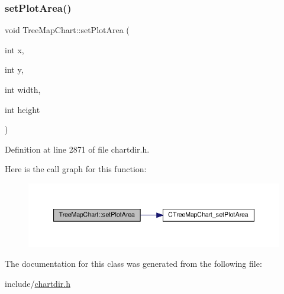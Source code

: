 \subsubsection{\texorpdfstring{set\+Plot\+Area()}{setPlotArea()}}
{\footnotesize\ttfamily void Tree\+Map\+Chart\+::set\+Plot\+Area (\begin{DoxyParamCaption}\item[{int}]{x,  }\item[{int}]{y,  }\item[{int}]{width,  }\item[{int}]{height }\end{DoxyParamCaption})\hspace{0.3cm}{\ttfamily [inline]}}



Definition at line 2871 of file chartdir.\+h.

Here is the call graph for this function\+:
\nopagebreak
\begin{figure}[H]
\begin{center}
\leavevmode
\includegraphics[width=350pt]{class_tree_map_chart_a23395c32c80a297aacbf1d17b3ff5932_cgraph}
\end{center}
\end{figure}


The documentation for this class was generated from the following file\+:\begin{DoxyCompactItemize}
\item 
include/\hyperlink{chartdir_8h}{chartdir.\+h}\end{DoxyCompactItemize}
